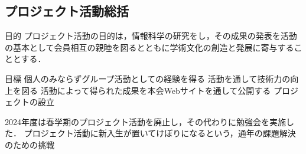 \subsection*{プロジェクト活動総括}


目的
    プロジェクト活動の目的は，情報科学の研究をし，その成果の発表を活動の基本として会員相互の親睦を図るとともに学術文化の創造と発展に寄与することとする．

目標
    個人のみならずグループ活動としての経験を得る
    活動を通して技術力の向上を図る
    活動によって得られた成果を本会Webサイトを通して公開する
    プロジェクトの設立

2024年度は春学期のプロジェクト活動を廃止し，その代わりに勉強会を実施した．
    プロジェクト活動に新入生が置いてけぼりになるという，通年の課題解決のための挑戦
    